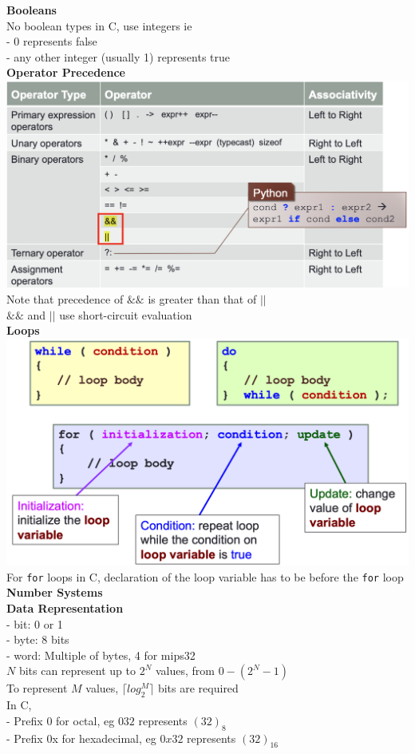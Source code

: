 \documentclass[10pt, a4paper]{article}
\begin{document}
\begin{multicols*}{3}
		\textbf{Booleans}\\
		No boolean types in C, use integers ie\\
		- 0 represents false\\
		- any other integer (usually 1) represents true\\
		
		\textbf{Operator Precedence}\\
		\includegraphics[scale= .5]{./assets/logicOperators}\\
		Note that precedence of $\&\&$ is greater than that of $||$\\
		$\&\&$ and $||$ use short-circuit evaluation\\
		
		\textbf{Loops}\\
		\includegraphics[scale=0.23]{./assets/loops}\\
		For \texttt{for} loops in C, declaration of the loop variable has to be before the \texttt{for} loop\\
		{\normalsize\textbf{Number Systems}}\\
		\textbf{Data Representation}\\
		- bit: 0 or 1\\
		- byte: 8 bits\\
		- word: Multiple of bytes, 4 for mips32\\
		$N$ bits can represent up to $2^N$ values, from $0 - (2^N - 1)$\\ 
		To represent $M$ values, $\lceil{log_2^M}\rceil$ bits are required\\
		In C,\\
		- Prefix 0 for octal, eg $032$ represents $(32)_8$\\
		- Prefix 0x for hexadecimal, eg $0x32$ represents $(32)_16$\\
		

\end{multicols*}
\end{document}
